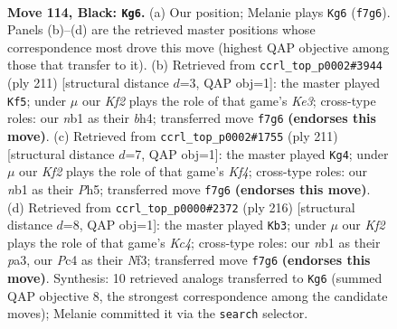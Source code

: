 \documentclass[11pt]{article}
\begin{document}
\clearpage

\begin{figure}[p]\centering
\begin{subfigure}{0.46\textwidth}\centering
\resizebox{\linewidth}{!}{%
\newchessgame
\chessboard[
  setfen={8/5k2/8/4B3/p1p3b1/8/5K2/1N6 b - - 83 114},
  showmover=false,
  pgfstyle=straightmove, color=movearrow, markmove={f7-g6}
]}
\caption{}
\end{subfigure}\hfill
\begin{subfigure}{0.46\textwidth}\centering
\resizebox{\linewidth}{!}{%
\newchessgame
\chessboard[
  setfen={8/1b6/4k3/7p/5p1B/8/8/6K1 b - - 59 106},
  showmover=false,
  pgfstyle=straightmove, color=movearrow, markmove={e6-f5}
]}
\caption{}
\end{subfigure}
\\[4pt]
\begin{subfigure}{0.46\textwidth}\centering
\resizebox{\linewidth}{!}{%
\newchessgame
\chessboard[
  setfen={b7/8/8/5k1p/7P/2B5/4K3/8 b - - 14 106},
  showmover=false,
  pgfstyle=straightmove, color=movearrow, markmove={f5-g4}
]}
\caption{}
\end{subfigure}\hfill
\begin{subfigure}{0.46\textwidth}\centering
\resizebox{\linewidth}{!}{%
\newchessgame
\chessboard[
  setfen={8/k5b1/8/8/2K5/p4N2/P7/8 w - - 74 109},
  showmover=false,
  pgfstyle=straightmove, color=movearrow, markmove={c4-b3}
]}
\caption{}
\end{subfigure}
\caption{\textbf{Move 114, Black: \texttt{Kg6}.} (a) Our position; Melanie plays \texttt{Kg6} (\texttt{f7g6}). Panels (b)--(d) are the retrieved master positions whose correspondence most drove this move (highest QAP objective among those that transfer to it). (b) Retrieved from \texttt{ccrl\_top\_p0002\#3944} (ply 211) [structural distance $d$=3, QAP obj=1]: the master played \texttt{Kf5}; under $\mu$ our \emph{Kf2} plays the role of that game's \emph{Ke3}; cross-type roles: our \emph{n}b1 as their \emph{b}h4; transferred move \texttt{f7g6} \textbf{(endorses this move)}. (c) Retrieved from \texttt{ccrl\_top\_p0002\#1755} (ply 211) [structural distance $d$=7, QAP obj=1]: the master played \texttt{Kg4}; under $\mu$ our \emph{Kf2} plays the role of that game's \emph{Kf4}; cross-type roles: our \emph{n}b1 as their \emph{P}h5; transferred move \texttt{f7g6} \textbf{(endorses this move)}. (d) Retrieved from \texttt{ccrl\_top\_p0000\#2372} (ply 216) [structural distance $d$=8, QAP obj=1]: the master played \texttt{Kb3}; under $\mu$ our \emph{Kf2} plays the role of that game's \emph{Kc4}; cross-type roles: our \emph{n}b1 as their \emph{p}a3, our \emph{P}c4 as their \emph{N}f3; transferred move \texttt{f7g6} \textbf{(endorses this move)}. Synthesis: 10 retrieved analogs transferred to \texttt{Kg6} (summed QAP objective 8, the strongest correspondence among the candidate moves); Melanie committed it via the \texttt{search} selector.}
\label{fig:thought-m227}
\end{figure}
\end{document}
